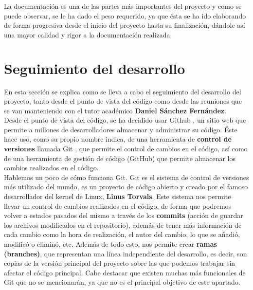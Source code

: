 La documentación es una de las partes más importantes del proyecto y como se puede observar,
se le ha dado el peso requerido, ya que ésta se ha ido elaborando de forma progresiva desde
el inicio del proyecto hasta su finalización, dándole así una mayor calidad y rigor a la
documentación realizada.

\section{Seguimiento del desarrollo} \label{sec:tracking}
En esta sección se explica como se lleva a cabo el seguimiento del desarrollo del proyecto,
tanto desde el punto de vista del código como desde las reuniones que se van manteniendo
con el tutor académico \textbf{Daniel Sánchez Fernández}.\\

Desde el punto de vista del código, se ha decidido usar Github \cite{github}, un sitio web
que permite a millones de desarrolladores almacenar y administrar su código. Éste hace uso,
como su propio nombre indica, de una herramienta de \textbf{control de versiones} llamada
Git \cite{git}, que permite el control de cambios en el código, así como de una herramienta
de gestión de código (GitHub) que permite almacenar los cambios realizados en el código.\\

Hablemos un poco de cómo funciona Git. Git es el sistema de control de versiones más
utilizado del mundo, es un proyecto de código abierto y creado por el famoso desarrollador
del kernel de Linux, \textbf{Linus Torvals}. Este sistema nos permite llevar un control de
cambios realizados en el código, de forma que podremos volver a estados pasados del mismo
a través de los \textbf{commits} (acción de guardar los archivos modificados en el
repositorio), además de tener más información de cada cambio como la hora de realización,
el autor del cambio, lo que se añadió, modificó o eliminó, etc. Además de todo esto, nos
permite crear \textbf{ramas (branches)}, que representan una línea independiente del
desarrollo, es decir, son copias de la versión principal del proyecto sobre las que podemos
trabajar sin afectar el código principal. Cabe destacar que existen muchas más
funcionales de Git que no se mencionarán, ya que no es el principal objetivo de este
apartado.\\

